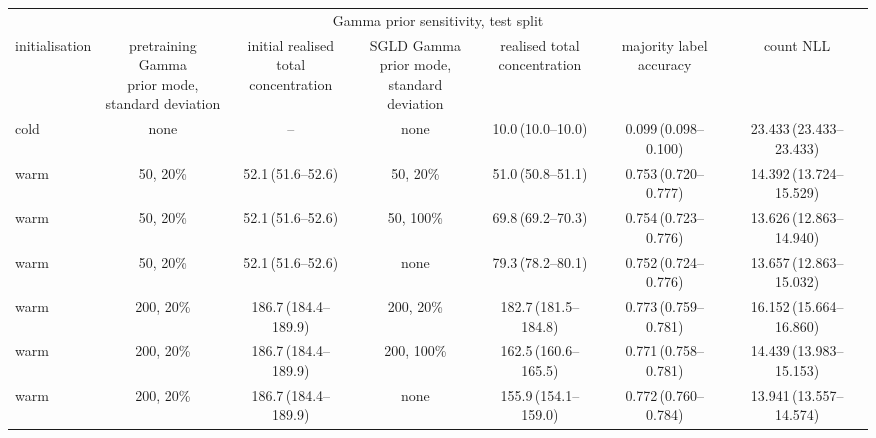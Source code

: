 \begin{tabular}{lcccccc}
\toprule
\multicolumn{7}{c}{Gamma prior sensitivity, test split} \\
initialisation & \shortstack{pretraining Gamma\\prior mode,\\standard deviation} & \shortstack{initial realised\\total concentration} & \shortstack{SGLD Gamma\\prior mode,\\standard deviation} & \shortstack{realised total\\concentration} & \shortstack{majority label\\accuracy} & count NLL \\
\midrule
cold & none & -- & none & 10.0\,(10.0--10.0) & 0.099\,(0.098--0.100) & 23.433\,(23.433--23.433) \\
warm & 50, 20\% & 52.1\,(51.6--52.6) & 50, 20\% & 51.0\,(50.8--51.1) & 0.753\,(0.720--0.777) & 14.392\,(13.724--15.529) \\
warm & 50, 20\% & 52.1\,(51.6--52.6) & 50, 100\% & 69.8\,(69.2--70.3) & 0.754\,(0.723--0.776) & 13.626\,(12.863--14.940) \\
warm & 50, 20\% & 52.1\,(51.6--52.6) & none & 79.3\,(78.2--80.1) & 0.752\,(0.724--0.776) & 13.657\,(12.863--15.032) \\
warm & 200, 20\% & 186.7\,(184.4--189.9) & 200, 20\% & 182.7\,(181.5--184.8) & 0.773\,(0.759--0.781) & 16.152\,(15.664--16.860) \\
warm & 200, 20\% & 186.7\,(184.4--189.9) & 200, 100\% & 162.5\,(160.6--165.5) & 0.771\,(0.758--0.781) & 14.439\,(13.983--15.153) \\
warm & 200, 20\% & 186.7\,(184.4--189.9) & none & 155.9\,(154.1--159.0) & 0.772\,(0.760--0.784) & 13.941\,(13.557--14.574) \\
\bottomrule
\end{tabular}
